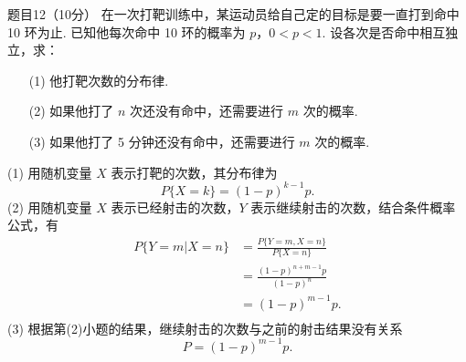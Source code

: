 \begin{question}{题目12（10分）}
    在一次打靶训练中，某运动员给自己定的目标是要一直打到命中 10 环为止. 已知他每次命中 10 环的概率为 $p$，$0<p<1$. 设各次是否命中相互独立，求：
    \begin{itemize}
        \item [(1)] 他打靶次数的分布律.
        \item [(2)] 如果他打了 $n$ 次还没有命中，还需要进行 $m$ 次的概率.
        \item [(3)] 如果他打了 5 分钟还没有命中，还需要进行 $m$ 次的概率.
    \end{itemize}
\end{question}
\begin{solution}
    (1) 用随机变量 $X$ 表示打靶的次数，其分布律为
    $$
        P\{X=k\} = (1-p)^{k-1}p.
    $$
    (2) 用随机变量 $X$ 表示已经射击的次数，$Y$ 表示继续射击的次数，结合条件概率公式，有
    $$
        \begin{aligned}
            P\{Y=m|X=n\}
             & = \frac{P\{Y=m, X=n\}}{P\{X=n\}} \\
             & = \frac{(1-p)^{n+m-1}p}{(1-p)^n} \\
             & = (1-p)^{m-1}p.                  \\
        \end{aligned}
    $$
    (3) 根据第(2)小题的结果，继续射击的次数与之前的射击结果没有关系
    $$
        P = (1-p)^{m-1}p.
    $$
\end{solution}

